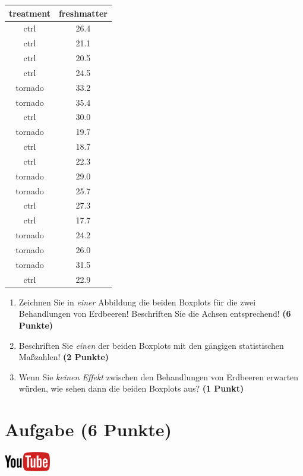 \documentclass[a4paper, 9pt]{scrartcl}\usepackage[]{graphicx}\usepackage[]{xcolor}
\begin{document}
\begin{table}[!h]
\centering
\begin{tabular}{cc}
\toprule
treatment & freshmatter\\
\midrule
ctrl & 26.4\\
ctrl & 21.1\\
ctrl & 20.5\\
ctrl & 24.5\\
tornado & 33.2\\
\addlinespace
tornado & 35.4\\
ctrl & 30.0\\
tornado & 19.7\\
ctrl & 18.7\\
ctrl & 22.3\\
\addlinespace
tornado & 29.0\\
tornado & 25.7\\
ctrl & 27.3\\
ctrl & 17.7\\
tornado & 24.2\\
\addlinespace
tornado & 26.0\\
tornado & 31.5\\
ctrl & 22.9\\
\bottomrule
\end{tabular}
\end{table}



\begin{enumerate}
\item Zeichnen Sie in \textit{einer} Abbildung die beiden Boxplots f{\"u}r die
  zwei Behandlungen von Erdbeeren! Beschriften Sie die Achsen entsprechend!
  \textbf{(6 Punkte)}
\item Beschriften Sie \textit{einen} der beiden Boxplots mit den g{\"a}ngigen
  statistischen Ma{\ss}zahlen! \textbf{(2 Punkte)}
\item Wenn Sie \textit{keinen Effekt} zwischen den Behandlungen von
  Erdbeeren erwarten w{\"u}rden, wie sehen dann die beiden Boxplots aus?
  \textbf{(1 Punkt)}
\end{enumerate} 
\clearpage

\section{Aufgabe \hfill (6 Punkte)}

\hfill\href{https://youtu.be/knAziLLQGb0}{\includegraphics[width =
  2cm]{img/youtube}}\\[1Ex]
\end{document}
